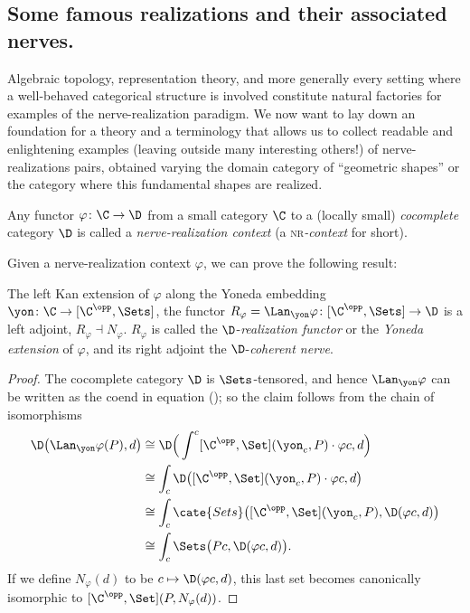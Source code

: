 \subsection{Some famous realizations and their associated nerves.}
Algebraic topology, representation theory, and more generally every setting where a well\hyp{}behaved categorical structure is involved constitute natural factories for examples of the nerve\hyp{}realization paradigm. We now want to lay down an foundation for a theory and a terminology that allows us to collect readable and enlightening examples (leaving outside many interesting others!) of nerve\hyp{}realizations pairs, obtained varying the domain category of ``geometric shapes'' or the category where this fundamental shapes are realized. 
\begin{definition}\label{nr-para}
Any functor $\varphi\colon \C\to \D$ from a small category $\C$ to a (locally small) \emph{cocomplete} category $\D$ is called a \emph{nerve\hyp{}realization context} (a \textsc{nr}\emph{-context} for short).
\end{definition}
Given a nerve\hyp{}realization context $\varphi$, we can prove the following result:
\begin{proposition}\label{nervereal}
The left Kan extension of $\varphi$ along the Yoneda embedding $\yon \colon \C\to [\C^\opp, \Sets]$, \ie the functor $R_\varphi=\Lan_\yon \varphi\colon [\C^\opp, \Sets]\to \D$ is a left adjoint, $R_\varphi\dashv N_\varphi$. $R_\varphi$ is called the $\D$-\emph{realization functor} or the \emph{Yoneda extension} of $\varphi$, and its right adjoint the $\D$-\emph{coherent nerve}.
\end{proposition} 
\begin{proof}
The cocomplete category $\D$ is $\Sets$-tensored, and hence $\Lan_\yon \varphi$ can be written as the coend in equation (); so the claim follows from the chain of isomorphisms
\begin{align*}
\D\big( \Lan_\yon \varphi(P),d \big)&\cong \D\Big(\int^c [\C^\opp,\Set](\yon_c,P)\cdot \varphi c,d \Big)\\
&\cong \int_c\D\big( [\C^\opp,\Set](\yon_c,P)\cdot \varphi c,d \big)\\
&\cong \int_c\cate{Sets}\big( [\C^\opp,\Set](\yon_c,P),\D(\varphi c,d) \big)\\
&\cong \int_c\Sets\big(Pc, \D(\varphi c,d)\big).
\end{align*}
If we define $N_\varphi(d)$ to be $c\mapsto \D(\varphi c,d)$, this last set becomes canonically isomorphic to $[\C^\opp,\Set](P,N_\varphi(d))$.
\end{proof}
